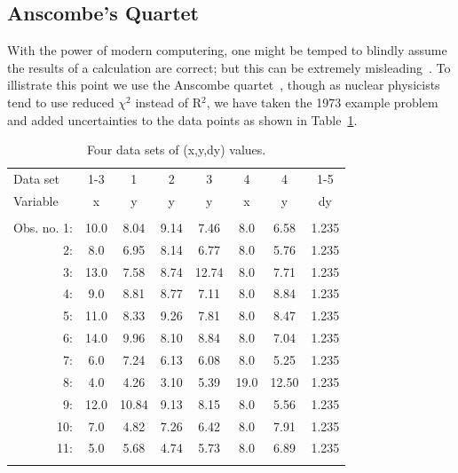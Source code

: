 \documentclass[10pt,aps,prc,twocolumn]{revtex4-1}
\begin{document}
\begin{appendix}

\section{Anscombe's Quartet}

With the power of modern computering, one might be temped to blindly assume the results of
a calculation are correct; but this can be extremely misleading~\cite{Sirca:2012}.  To illistrate
this point we use the Anscombe quartet~\cite{Anscombe:1973}, though as nuclear physicists tend 
to use reduced $\chi^2$ instead of R$^2$, we have taken the 1973 example
problem and added uncertainties to the data points as shown in Table~\ref{quartet}.

\begin{table}[htb]
\caption{Four data sets of (x,y,dy) values.}
\begin{tabular}{rccccccc}
\multicolumn{1}{l}{Data set}    & 1-3  & 1    & 2    & 3    & 4   & 4    & 1-5   \\
\multicolumn{1}{l}{Variable}    & x    & y    & y    & y    & x   & y    & dy    \\  
                                &      &      &      &      &     &      &       \\
Obs. no. 1: & 10.0 & 8.04 & 9.14 & 7.46 & 8.0 & 6.58 & 1.235 \\ 
         2: &  8.0 & 6.95 & 8.14 & 6.77 & 8.0 & 5.76 & 1.235 \\
         3: & 13.0 & 7.58 & 8.74 &12.74 & 8.0 & 7.71 & 1.235 \\
         4: &  9.0 & 8.81 & 8.77 & 7.11 & 8.0 & 8.84 & 1.235 \\
         5: & 11.0 & 8.33 & 9.26 & 7.81 & 8.0 & 8.47 & 1.235 \\
         6: & 14.0 & 9.96 & 8.10 & 8.84 & 8.0 & 7.04 & 1.235 \\
         7: &  6.0 & 7.24 & 6.13 & 6.08 & 8.0 & 5.25 & 1.235 \\
         8: &  4.0 & 4.26 & 3.10 & 5.39 &19.0 &12.50 & 1.235 \\
         9: & 12.0 &10.84 & 9.13 & 8.15 & 8.0 & 5.56 & 1.235 \\
        10: &  7.0 & 4.82 & 7.26 & 6.42 & 8.0 & 7.91 & 1.235 \\
        11: &  5.0 & 5.68 & 4.74 & 5.73 & 8.0 & 6.89 & 1.235 \\ 
            &      &      &      &      &     &      &       \\ \hline
\end{tabular}
\label{quartet}
\end{table}


\end{appendix}
\end{document}
